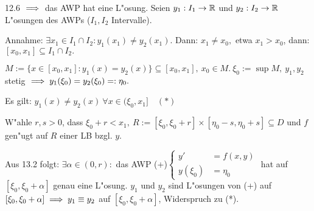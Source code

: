 \documentclass{article}
\begin{document}
\begin{beweis}
12.6 $\implies$ das AWP hat eine L"osung. Seien $y_1:I_1\to\mathbb{R}$ und $y_2:I_2\to\mathbb{R}$ L"osungen des AWPs ($I_1,I_2$ Intervalle).

Annahme: $\exists x_1\in I_1\cap I_2: y_1(x_1)\ne y_2(x_1).$ Dann: $x_1 \ne x_0,$ etwa $x_1>x_0$, dann: $[x_0,x_1]\subseteq I_1\cap I_2.$

$M:=\{x\in[x_0,x_1]:y_1(x)=y_2(x)\}\subseteq [x_0,x_1],\ x_0\in M.\ \xi_0:=\sup M,\ y_1,y_2$ stetig $\implies y_1(\xi_0) = y_2(\xi_0) =:\eta_0.$

Es gilt: $y_1(x) \ne y_2(x)\ \forall x\in(\xi_0,x_1]\quad (*)$

W"ahle $r,s>0$, dass $\xi_0+r<x_1,\ R:=[\xi_0,\xi_0+r]\times[\eta_0-s,\eta_0+s]\subseteq D$ und $f$ gen"ugt auf $R$ einer LB bzgl. $y$.

Aus 13.2 folgt: $\exists \alpha\in(0,r):$ das AWP (+)$\begin{cases}
y'       &=f(x,y)\\
y(\xi_0) &=\eta_0
\end{cases}$ hat auf $[\xi_0,\xi_0+\alpha]$ genau eine L"osung. $y_1$ und $y_2$ sind L"osungen von (+) auf $[\xi_0,\xi_0+\alpha] \implies y_1 \equiv y_2$ auf $[\xi_0,\xi_0+\alpha]$, Widerspruch zu (*).
\end{beweis}
\end{document}
